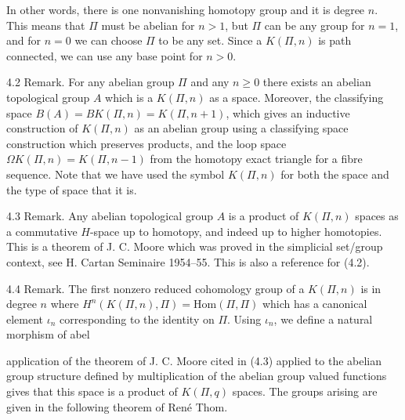 In other words, there is one nonvanishing homotopy group and it is degree $n$. This means that $\Pi$ must be abelian for $n > 1$, but $\Pi$ can be any group for $n = 1$, and for $n = 0$ we can choose $\Pi$ to be any set. Since a $K(\Pi, n)$ is path connected, we can use any base point for $n > 0$.

4.2 Remark. For any abelian group $\Pi$ and any $n \geq 0$ there exists an abelian topological group $A$ which is a $K(\Pi, n)$ as a space. Moreover, the classifying space $B(A) = BK(\Pi, n) = K(\Pi, n + 1)$, which gives an inductive construction of $K(\Pi, n)$ as an abelian group using a classifying space construction which preserves products, and the loop space $\Omega K(\Pi, n) = K(\Pi, n - 1)$ from the homotopy exact triangle for a fibre sequence. Note that we have used the symbol $K(\Pi, n)$ for both the space and the type of space that it is.

4.3 Remark. Any abelian topological group $A$ is a product of $K(\Pi, n)$ spaces as a commutative $H$-space up to homotopy, and indeed up to higher homotopies. This is a theorem of J. C. Moore which was proved in the simplicial set/group context, see H. Cartan Seminaire 1954–55. This is also a reference for (4.2).

4.4 Remark. The first nonzero reduced cohomology group of a $K(\Pi, n)$ is in degree $n$ where $H^n(K(\Pi, n), \Pi) = \text{Hom}(\Pi, \Pi)$ which has a canonical element $\iota_n$ corresponding to the identity on $\Pi$. Using $\iota_n$, we define a natural morphism of abel

application of the theorem of J. C. Moore cited in (4.3) applied to the abelian group structure defined by multiplication of the abelian group valued functions gives that this space is a product of $K(\Pi, q)$ spaces. The groups arising are given in the following theorem of René Thom.
